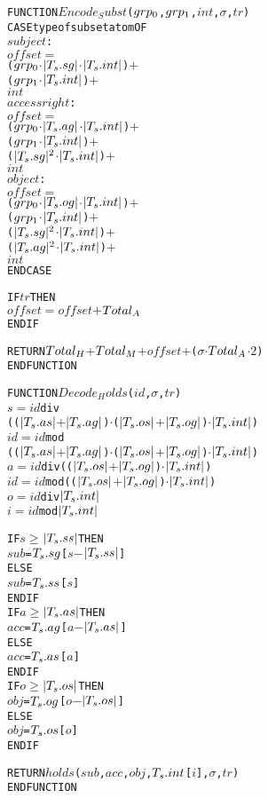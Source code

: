 \documentclass[11pt]{report}
\newenvironment{vverbatim}
{
  \begin{alltt}
}
{
  \vspace{-\baselineskip}
  \end{alltt}
}
\begin{document}
        \begin{vverbatim}
  FUNCTION \(Encode_Subst\)(\(grp\sb{0}\), \(grp\sb{1}\), \(int\), \(\sigma\), \(tr\))
    CASE type of subset atom OF
      \(subject\) :
        \(offset\) \(=\)
          (\(grp\sb{0}\) \(\cdot\) \(|T\sb{s}.sg|\) \(\cdot\) \(|T\sb{s}.int|\)) \(+\)
          (\(grp\sb{1}\) \(\cdot\) \(|T\sb{s}.int|\)) \(+\)
          \(int\)
      \(access right\) :
        \(offset\) \(=\)
          (\(grp\sb{0}\) \(\cdot\) \(|T\sb{s}.ag|\) \(\cdot\) \(|T\sb{s}.int|\)) \(+\)
          (\(grp\sb{1}\) \(\cdot\) \(|T\sb{s}.int|\)) \(+\)
          (\(|T\sb{s}.sg|\sp{2}\) \(\cdot\) \(|T\sb{s}.int|\)) \(+\)
          \(int\)
      \(object\) :
        \(offset\) \(=\)
          (\(grp\sb{0}\) \(\cdot\) \(|T\sb{s}.og|\) \(\cdot\) \(|T\sb{s}.int|\)) \(+\)
          (\(grp\sb{1}\) \(\cdot\) \(|T\sb{s}.int|\)) \(+\)
          (\(|T\sb{s}.sg|\sp{2}\) \(\cdot\) \(|T\sb{s}.int|\)) \(+\)
          (\(|T\sb{s}.ag|\sp{2}\) \(\cdot\) \(|T\sb{s}.int|\)) \(+\)
          \(int\)
    ENDCASE
      
    IF \(tr\) THEN
      \(offset\) \(=\) \(offset\) \(+\) \(Total\sb{A}\)
    ENDIF

    RETURN \(Total\sb{H}\) \(+\) \(Total\sb{M}\) \(+\) \(offset\) \(+\) (\(\sigma\) \(\cdot\) \(Total\sb{A}\) \(\cdot\) \(2\))
  ENDFUNCTION
        \end{vverbatim}


        \begin{vverbatim}
  FUNCTION \(Decode_Holds\)(\(id\), \(\sigma\), \(tr\))
    \(s\) \(=\) \(id\) div
        ((\(|T\sb{s}.as|\) \(+\) \(|T\sb{s}.ag|\)) \(\cdot\) (\(|T\sb{s}.os|\) \(+\) \(|T\sb{s}.og|\)) \(\cdot\) \(|T\sb{s}.int|\))
    \(id\) \(=\) \(id\) mod
        ((\(|T\sb{s}.as|\) \(+\) \(|T\sb{s}.ag|\)) \(\cdot\) (\(|T\sb{s}.os|\) \(+\) \(|T\sb{s}.og|\)) \(\cdot\) \(|T\sb{s}.int|\))
    \(a\) \(=\) \(id\) div ((\(|T\sb{s}.os|\) \(+\) \(|T\sb{s}.og|\)) \(\cdot\) \(|T\sb{s}.int|\))
    \(id\) \(=\) \(id\) mod ((\(|T\sb{s}.os|\) \(+\) \(|T\sb{s}.og|\)) \(\cdot\) \(|T\sb{s}.int|\))
    \(o\) \(=\) \(id\) div \(|T\sb{s}.int|\)
    \(i\) \(=\) \(id\) mod \(|T\sb{s}.int|\)

    IF \(s\) \(\geq\) \(|T\sb{s}.ss|\) THEN
      \(sub\) = \(T\sb{s}.sg\)[\(s\) \(-\) \(|T\sb{s}.ss|\)]
    ELSE
      \(sub\) = \(T\sb{s}.ss\)[\(s\)]
    ENDIF
    IF \(a\) \(\geq\) \(|T\sb{s}.as|\) THEN
      \(acc\) = \(T\sb{s}.ag\)[\(a\) \(-\) \(|T\sb{s}.as|\)]
    ELSE
      \(acc\) = \(T\sb{s}.as\)[\(a\)]
    ENDIF
    IF \(o\) \(\geq\) \(|T\sb{s}.os|\) THEN
      \(obj\) = \(T\sb{s}.og\)[\(o\) \(-\) \(|T\sb{s}.os|\)]
    ELSE
      \(obj\) = \(T\sb{s}.os\)[\(o\)]
    ENDIF

    RETURN \(holds\)(\(sub\), \(acc\), \(obj\), \(T\sb{s}.int\)[\(i\)], \(\sigma\), \(tr\))
  ENDFUNCTION
        \end{vverbatim}
\end{document}

